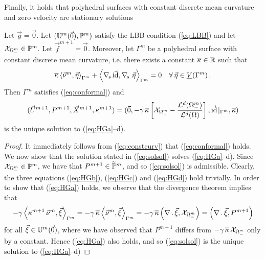 Finally, it holds that polyhedral surfaces with constant discrete mean
curvature and zero velocity are stationary solutions
\begin{theorem} \label{thm:stat2}
Let $\vec g=\vec 0$. Let $(\uspacedisc{0}{m},\pspace^m)$ satisfy the LBB
condition (\ref{eq:LBB}) and let
$\charfcn{\Omega^m_-}\in\pspace^m$. Let $\vec f^{m+1} = \vec 0$. Moreover, let
$\Gamma^m$ be a polyhedral surface with constant discrete mean curvature,
i.e. there exists a constant $\overline{\kappa}\in\R$ such that
\begin{equation}\label{eq:constcurv}
\overline{\kappa} \left\langle\vec\nu^m,\vec\eta\right\rangle_{\Gamma^m}
+ \left\langle \nabs\, \vec\id,\nabs\ \vec\eta\right\rangle_{\Gamma^m}=0\quad
\forall \,\vec\eta\in\Vh\,.
\end{equation}
Then $\Gamma^m$ satisfies (\ref{eq:conformal}) and
\begin{equation} \label{eq:solsol}
(\vec U^{m+1}, P^{m+1}, \vec X^{m+1}, \kappa^{m+1}) =
(\vec 0, -\gamma\,\overline\kappa\left[
\charfcn{\Omega_-^m} - \frac{\vol(\Omega_-^m)}{\vol(\Omega)}
\right], \vec\id\!\mid_{\Gamma^m}, \overline{\kappa})
\end{equation}
is the unique solution to (\ref{eq:HGa}--d).
\end{theorem}
\begin{proof}
It immediately follows from (\ref{eq:constcurv}) that (\ref{eq:conformal})
holds. We now show that the solution stated in (\ref{eq:solsol}) solves
(\ref{eq:HGa}--d). Since $\charfcn{\Omega_-^m} \in \pspace^m$, we have
that $P^{m+1} \in \pnormspace^m$, and so (\ref{eq:solsol}) is admissible.
Clearly, the three equations (\ref{eq:HGb}), (\ref{eq:HGc}) and (\ref{eq:HGd})
hold trivially. In order to show that (\ref{eq:HGa}) holds, we observe that the
divergence theorem implies that
\begin{equation*}
- \gamma \left\langle \kappa^{m+1}\,\vec\nu^m, \vec\xi
\right\rangle_{\Gamma^m}
= - \gamma\,\overline\kappa \left\langle \vec\nu^m, \vec\xi
\right\rangle_{\Gamma^m}
= - \gamma\,\overline\kappa \left(\nabla\,.\,\vec\xi,
\charfcn{\Omega_-^m}\right)
= \left(\nabla\,.\,\vec\xi, P^{m+1} \right)
\end{equation*}
for all $\vec\xi \in \uspacedisc{0}{m}$, where we have observed that $P^{m+1}$
differs from $- \gamma\,\overline\kappa\,\charfcn{\Omega_-^m}$ only by a
constant. Hence (\ref{eq:HGa}) also holds, and so (\ref{eq:solsol}) is the
unique solution to (\ref{eq:HGa}--d)
\end{proof}

